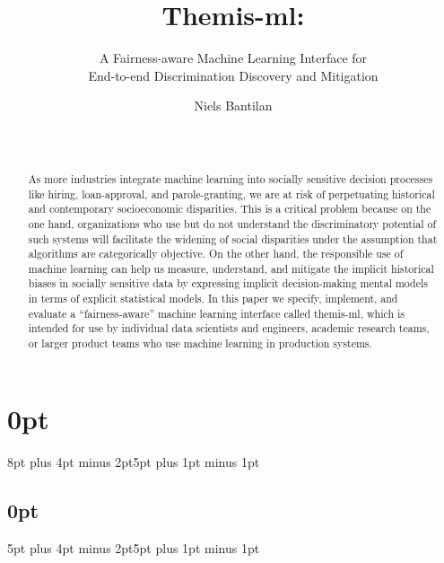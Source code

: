 \documentclass{{interact/interact}}
\begin{document}
\titlespacing\section{0pt}{8pt plus 4pt minus 2pt}{5pt plus 1pt minus 1pt}
\titlespacing\subsection{0pt}{5pt plus 4pt minus 2pt}{5pt plus 1pt minus 1pt}



\title{
  Themis-ml:
}
\subtitle{
    A Fairness-aware Machine Learning Interface for \\
    End-to-end Discrimination Discovery and Mitigation
}


\author{
\alignauthor
Niels Bantilan\\
       \\
       \\
}

\maketitle

\begin{abstract}
As more industries integrate machine learning into socially sensitive decision
processes like hiring, loan-approval, and parole-granting, we are at risk of
perpetuating historical and contemporary socioeconomic disparities. This is a
critical problem because on the one hand, organizations who use but do not
understand the discriminatory potential of such systems will facilitate the
widening of social disparities under the assumption that algorithms are
categorically objective. On the other hand, the responsible use of machine
learning can help us measure, understand, and mitigate the implicit historical
biases in socially sensitive data by expressing implicit decision-making mental
models in terms of explicit statistical models. In this paper we specify,
implement, and evaluate a ``fairness-aware'' machine learning interface called
themis-ml, which is intended for use by individual data scientists and
engineers, academic research teams, or larger product teams who use machine
learning in production systems.
\end{abstract}
\end{document}
